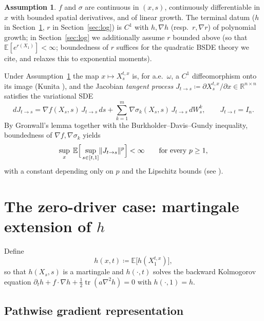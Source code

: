 \documentclass[11pt]{article}
\theoremstyle{definition}
\newtheorem{assumption}[theorem]{Assumption}
\theoremstyle{remark}
\newcommand{\R}{\mathbb{R}}
\newcommand{\E}{\mathbb{E}}
\newcommand{\tr}{\operatorname{tr}}
\newcommand{\grad}{\nabla}
\DeclarePairedDelimiter{\norm}{\lVert}{\rVert}
\begin{document}
\begin{assumption}\label{ass:reg}
$f$ and $\sigma$ are continuous in $(x,s)$, continuously differentiable in $x$ with bounded
spatial derivatives, and of linear growth. The terminal datum ($h$ in
Section~\ref{sec:zero}, $r$ in Section~\ref{sec:log}) is $C^1$ with $h,\grad h$ (resp.\
$r,\grad r$) of polynomial growth; in Section~\ref{sec:log} we additionally assume $r$
bounded above (so that $\E[e^{r(X_1)}]<\infty$; boundedness of $r$ suffices for the quadratic
BSDE theory we cite, and \cite{BriandHu} relaxes this to exponential moments).
\end{assumption}

Under Assumption~\ref{ass:reg} the map $x\mapsto X^{t,x}_s$ is, for a.e.\ $\omega$, a $C^1$
diffeomorphism onto its image (Kunita \cite[Thm.~4.6.5]{Kunita}), and the Jacobian
\emph{tangent process} $J_{t\to s} \coloneqq \partial X^{t,x}_s/\partial x \in \R^{n\times n}$
satisfies the variational SDE
\begin{equation}\label{eq:tangent}
dJ_{t\to s} = \grad f(X_s,s)\,J_{t\to s}\,ds
+ \sum_{k=1}^m \grad\sigma_k(X_s,s)\,J_{t\to s}\,dW^k_s,
\qquad J_{t\to t} = I_n .
\end{equation}
By Gronwall's lemma together with the Burkholder--Davis--Gundy inequality, boundedness of
$\grad f,\grad\sigma_k$ yields
\begin{equation}\label{eq:Jmoments}
\sup_{x}\;\E\Big[\sup_{s\in[t,1]}\norm{J_{t\to s}}^p\Big] < \infty
\qquad\text{for every } p\ge 1,
\end{equation}
with a constant depending only on $p$ and the Lipschitz bounds (see
\cite[Sec.~4.6]{Kunita}).

\section{The zero-driver case: martingale extension of $h$}\label{sec:zero}

Define
\begin{equation}
h(x,t) \coloneqq \E\big[h(X^{t,x}_1)\big],
\end{equation}
so that $h(X_s,s)$ is a martingale and $h(\cdot,t)$ solves the backward Kolmogorov equation
$\partial_t h + f\cdot\grad h + \tfrac12\tr(a\grad^2 h) = 0$ with $h(\cdot,1)=h$.

\subsection{Pathwise gradient representation}
\end{document}
